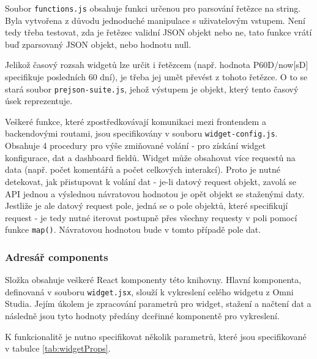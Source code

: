 \documentclass[czech, bc, kiv, he, iso690numb]{fasthesis}
\begin{document}
Soubor \texttt{functions.js} obsahuje funkci určenou pro parsování řetězce na string. Byla vytvořena z důvodu jednoduché manipulace s uživatelovým vstupem. Není tedy třeba
testovat, zda je řetězec validní JSON objekt nebo ne, tato funkce vrátí buď zparsovaný JSON objekt, nebo hodnotu null.

Jelikož časový rozsah widgetů lze určit i řetězcem (např. hodnota P60D/now[sD] specifikuje posledních 60 dní), je třeba jej umět převést z tohoto řetězce. O to se stará soubor
\texttt{prejson-suite.js}, jehož výstupem je objekt, který tento časový úsek reprezentuje.

Veškeré funkce, které zpostředkovávají komunikaci mezi frontendem a backendovými routami, jsou specifikovány v souboru \texttt{widget-config.js}. Obsahuje 4 procedury pro výše zmiňované
volání - pro získání widget konfigurace, dat a dashboard fieldů. Widget může obsahovat více requestů na data (např. počet komentářů a počet celkových interakcí). Proto je nutné detekovat,
jak přistupovat k volání dat - je-li datový request objekt, zavolá se API jednou a výslednou návratovou hodnotou je opět objekt se staženými daty. Jestliže je ale datový request pole, jedná se o pole objektů, které specifikují request - je tedy
nutné iterovat postupně přes všechny requesty v poli pomocí funkce \texttt{map()}. Návratovou hodnotou bude v tomto případě pole dat.

\subsubsection{Adresář components}

Složka obsahuje veškeré React komponenty této knihovny. Hlavní komponenta, definovaná v souboru \texttt{widget.jsx}, slouží k vykreslení celého widgetu z Omni Studia. Jejím úkolem
je zpracování parametrů pro widget, stažení a načtení dat a následně jsou tyto hodnoty předány dceřinné komponentě pro vykreslení.

K funkcionalitě je nutno specifikovat několik parametrů, které jsou specifikované v tabulce \ref{tab:widgetProps}.
\end{document}
